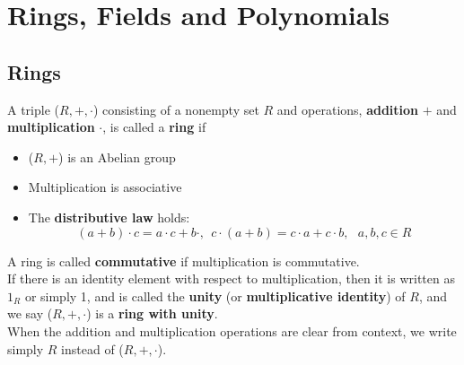 
\chapter{Rings, Fields and Polynomials}

\section{Rings}

\begin{definition}[Ring]\label{def: ring}
    A triple (\(R, +, \cdot\)) consisting of a nonempty set \(R\) and operations, \textbf{addition}
    \(+\) and \textbf{multiplication} \(\cdot\), is called a \textbf{ring} if 
    \begin{itemize}
        \item (\(R, +\)) is an Abelian group
        \item Multiplication is associative
        \item The \textbf{distributive law} holds:
        \[
            (a + b) \cdot c = a \cdot c + b \cdot, \:\: c \cdot (a + b) = c \cdot a + c \cdot b, \:\:\: a,b,c \in R  
        \]
    \end{itemize}
\end{definition}

\begin{note}
    A ring is called \textbf{commutative} if multiplication is commutative. \\
    If there is an identity element with respect to multiplication, then it is written as 
    \(1_R\) or simply 1, and is called the \textbf{unity} (or \textbf{multiplicative identity})
    of \(R\), and we say (\(R, +, \cdot\)) is a \textbf{ring with unity}. \\
    When the addition and multiplication operations are clear from context, we write simply
    \(R\) instead of (\(R, +, \cdot\)).
\end{note}


